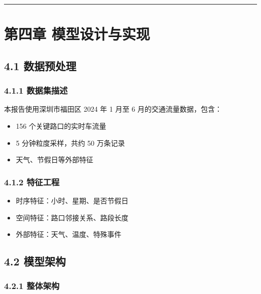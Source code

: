 \documentclass{harryopo-report}
\begin{document}
\medskip\hrule\medskip

\chapter*{第四章 模型设计与实现}

\section*{4.1 数据预处理}

\subsection*{4.1.1 数据集描述}

本报告使用深圳市福田区 2024 年 1 月至 6 月的交通流量数据，包含：

\begin{itemize}
  \item 156 个关键路口的实时车流量
  \item 5 分钟粒度采样，共约 50 万条记录
  \item 天气、节假日等外部特征
\end{itemize}

\subsection*{4.1.2 特征工程}

\begin{itemize}
  \item 时序特征：小时、星期、是否节假日
  \item 空间特征：路口邻接关系、路段长度
  \item 外部特征：天气、温度、特殊事件
\end{itemize}

\section*{4.2 模型架构}

\subsection*{4.2.1 整体架构}
\end{document}
